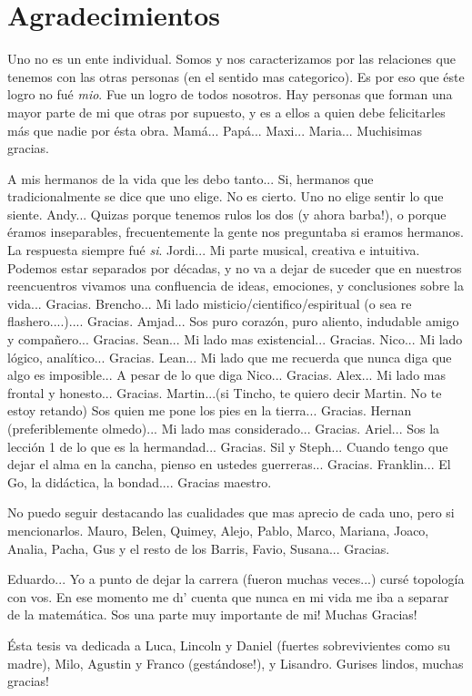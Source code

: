 \section{Agradecimientos}

Uno no es un ente individual. Somos y nos caracterizamos por las relaciones que tenemos con las otras personas (en el sentido mas categorico). Es por eso que \'este logro no fu\'e \emph{mio}. Fue un logro de todos nosotros. Hay personas que forman una mayor parte de mi que otras por supuesto, y es a ellos a quien debe felicitarles m\'as que nadie por \'esta obra. Mam\'a... Pap\'a... Maxi... Maria... Muchisimas gracias.


 A mis hermanos de la vida que les debo tanto... Si, hermanos que tradicionalmente se dice que uno elige. No es cierto. Uno no elige sentir lo que siente.  Andy... Quizas porque tenemos rulos los dos (y ahora barba!), o porque \'eramos inseparables, frecuentemente la gente  nos preguntaba si eramos hermanos. La respuesta siempre fu\'e \emph{si}.  Jordi... Mi parte musical, creativa e intuitiva. Podemos estar separados por d\'ecadas, y no va a dejar de suceder que en nuestros reencuentros vivamos una confluencia de ideas, emociones, y conclusiones sobre la vida... Gracias. Brencho... Mi lado misticio/cientifico/espiritual (o sea re flashero....).... Gracias. Amjad... Sos puro coraz\'on, puro aliento, indudable amigo y compa\~nero... Gracias. Sean... Mi lado mas existencial... Gracias.   Nico...  Mi lado l\'ogico, anal\'itico... Gracias. Lean... Mi lado que me recuerda que nunca diga que algo es imposible... A pesar de lo que diga Nico... Gracias. Alex... Mi lado mas frontal y honesto... Gracias.  Martin...(si Tincho, te quiero decir Martin. No te estoy retando) Sos quien me pone los pies en la tierra... Gracias. Hernan (preferiblemente olmedo)... Mi lado mas considerado... Gracias. Ariel... Sos la lecci\'on 1 de lo que es la hermandad...  Gracias. Sil y Steph... Cuando tengo que dejar el alma en la cancha, pienso en ustedes guerreras...  Gracias. Franklin... El Go, la did\'actica, la bondad.... Gracias maestro. 
 

 No puedo seguir destacando las cualidades que mas aprecio de cada uno, pero si mencionarlos. Mauro, Belen, Quimey, Alejo, Pablo, Marco, Mariana, Joaco, Analia, Pacha, Gus y el resto de los Barris, Favio, Susana... Gracias. 
 
\vspace{1ex} 
 
Eduardo...  Yo a punto de dejar la carrera (fueron muchas veces...) curs\'e topolog\'ia con vos. En ese momento me d\i' cuenta que nunca en mi vida me iba a separar de la matem\'atica. Sos una parte muy importante de mi! Muchas Gracias!  
 
 
\vspace{1ex}
\'Esta tesis va dedicada a Luca, Lincoln y Daniel (fuertes sobrevivientes como su madre), Milo, Agustin y Franco (gest\'andose!), y Lisandro. Gurises lindos, muchas gracias! 
 
 


 
 

